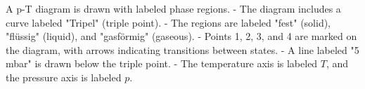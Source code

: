 A p-T diagram is drawn with labeled phase regions.  
- The diagram includes a curve labeled "Tripel" (triple point).  
- The regions are labeled "fest" (solid), "flüssig" (liquid), and "gasförmig" (gaseous).  
- Points 1, 2, 3, and 4 are marked on the diagram, with arrows indicating transitions between states.  
- A line labeled "5 mbar" is drawn below the triple point.  
- The temperature axis is labeled \( T \), and the pressure axis is labeled \( p \).